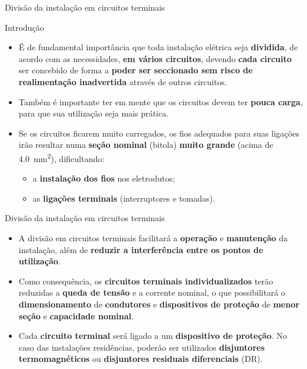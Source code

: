 \begin{frame}{Divisão da instalação em circuitos terminais}
	\begin{block}{Introdução}
		\begin{itemize}
			\item É de fundamental importância que toda instalação elétrica seja \textbf{dividida}, de acordo com as necessidades, \textbf{em vários circuitos}, devendo \textbf{cada circuito} ser concebido de forma a \textbf{poder ser seccionado sem risco de realimentação inadvertida} através de outros circuitos.
			\item Também é importante ter em mente que os circuitos devem ter \textbf{pouca carga}, para que sua utilização seja mais prática.
			\item Se os circuitos ficarem muito carregados, os fios adequados para suas ligações irão resultar numa \textbf{seção nominal} (bitola) \textbf{muito grande} (acima de \SI{4.0}{\milli\meter\squared}), dificultando:

			      \begin{itemize}
				      \item\normalsize a \textbf{instalação dos fios} nos eletrodutos;
				      \item\normalsize as \textbf{ligações terminais} (interruptores e tomadas).
			      \end{itemize}
		\end{itemize}
	\end{block}
\end{frame}


\begin{frame}{Divisão da instalação em circuitos terminais}
	\begin{block}{}
		\begin{itemize}
			\item A divisão em circuitos terminais facilitará a \textbf{operação} e \textbf{manutenção} da instalação, além de \textbf{reduzir a interferência entre os pontos de utilização}.
			\item Como consequência, os \textbf{circuitos terminais individualizados }terão reduzidas a \textbf{queda de tensão }e a corrente nominal, o que possibilitará o \textbf{dimensionamento }de \textbf{condutores }e \textbf{dispositivos de proteção }de \textbf{menor seção }e \textbf{capacidade nominal}.
			\item Cada \textbf{circuito terminal }será ligado a um \textbf{dispositivo de proteção}. No caso das instalações residências, poderão ser utilizados \textbf{disjuntores termomagnéticos }ou \textbf{disjuntores residuais diferenciais }(DR).
		\end{itemize}

	\end{block}
\end{frame}


